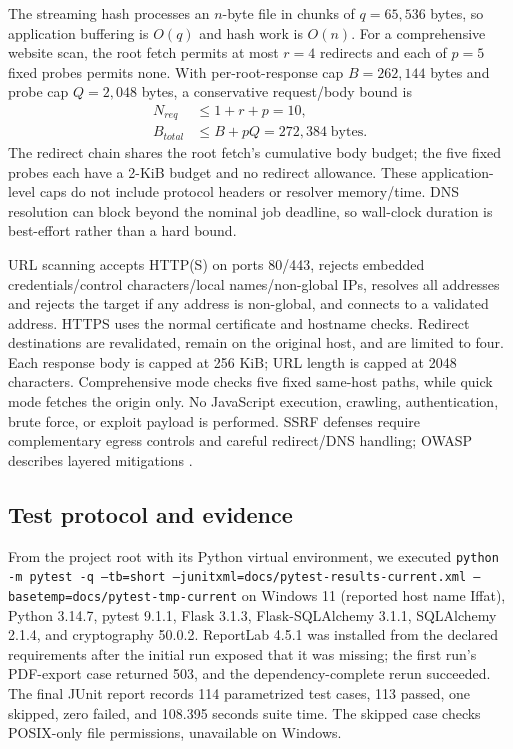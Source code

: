 \documentclass[conference]{IEEEtran}
\begin{document}
The streaming hash processes an $n$-byte file in chunks of $q=65{,}536$ bytes, so application buffering is $O(q)$ and hash work is $O(n)$. For a comprehensive website scan, the root fetch permits at most $r=4$ redirects and each of $p=5$ fixed probes permits none. With per-root-response cap $B=262{,}144$ bytes and probe cap $Q=2{,}048$ bytes, a conservative request/body bound is
\begin{equation}
\begin{aligned}
N_{req}&\leq 1+r+p=10,\\
B_{total}&\leq B+pQ=272{,}384\;\mathrm{bytes}.
\end{aligned}
\label{eq:scanbound}
\end{equation}
The redirect chain shares the root fetch's cumulative body budget; the five fixed probes each have a 2-KiB budget and no redirect allowance. These application-level caps do not include protocol headers or resolver memory/time. DNS resolution can block beyond the nominal job deadline, so wall-clock duration is best-effort rather than a hard bound.

URL scanning accepts HTTP(S) on ports 80/443, rejects embedded credentials/control characters/local names/non-global IPs, resolves all addresses and rejects the target if any address is non-global, and connects to a validated address. HTTPS uses the normal certificate and hostname checks. Redirect destinations are revalidated, remain on the original host, and are limited to four. Each response body is capped at 256 KiB; URL length is capped at 2048 characters. Comprehensive mode checks five fixed same-host paths, while quick mode fetches the origin only. No JavaScript execution, crawling, authentication, brute force, or exploit payload is performed. SSRF defenses require complementary egress controls and careful redirect/DNS handling; OWASP describes layered mitigations \cite{owaspssrf}.

\subsection{Test protocol and evidence}
From the project root with its Python virtual environment, we executed \texttt{python -m pytest -q --tb=short --junitxml=docs/pytest-results-current.xml --basetemp=docs/pytest-tmp-current} on Windows 11 (reported host name Iffat), Python 3.14.7, pytest 9.1.1, Flask 3.1.3, Flask-SQLAlchemy 3.1.1, SQLAlchemy 2.1.4, and cryptography 50.0.2. ReportLab 4.5.1 was installed from the declared requirements after the initial run exposed that it was missing; the first run's PDF-export case returned 503, and the dependency-complete rerun succeeded. The final JUnit report records 114 parametrized test cases, 113 passed, one skipped, zero failed, and 108.395 seconds suite time. The skipped case checks POSIX-only file permissions, unavailable on Windows.
\end{document}
